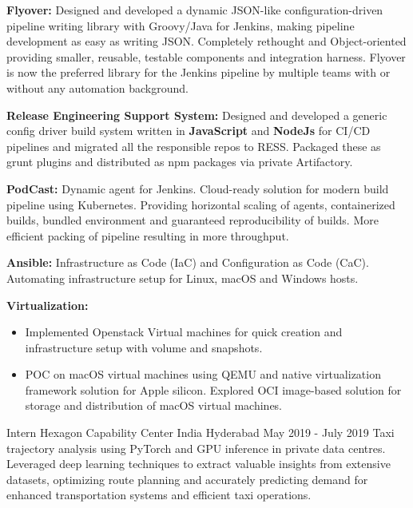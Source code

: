 \begin{cventries}
{        \item \textbf{Flyover:} Designed and developed a dynamic JSON-like configuration-driven pipeline writing library with Groovy/Java for Jenkins, making pipeline development as easy as writing JSON. Completely rethought and Object-oriented providing smaller, reusable, testable components and integration harness. Flyover is now the preferred library for the Jenkins pipeline by multiple teams with or without any automation background.
        \item \textbf{Release Engineering Support System:} Designed and developed a generic config driver build system written in \textbf{JavaScript} and \textbf{NodeJs} for CI/CD pipelines and migrated all the responsible repos to RESS. Packaged these as grunt plugins and distributed as npm packages via private Artifactory.
        \item \textbf{PodCast:} Dynamic agent for Jenkins. Cloud-ready solution for modern build pipeline using Kubernetes. Providing horizontal scaling of agents, containerized builds, bundled environment and guaranteed reproducibility of builds. More efficient packing of pipeline resulting in more throughput.
        \item \textbf{Ansible:} Infrastructure as Code (IaC) and Configuration as Code (CaC). Automating infrastructure setup for Linux, macOS and Windows hosts.
        \item \textbf{Virtualization:}
        \begin{itemize}
            \item Implemented Openstack Virtual machines for quick creation and infrastructure setup with volume and snapshots.
            \item POC on macOS virtual machines using QEMU and native virtualization framework solution for Apple silicon. Explored OCI image-based solution for storage and distribution of macOS virtual machines.
        \end{itemize}
    }

\vspace{-5mm}

\cventry
    {Intern} %
    {Hexagon Capability Center India} %
    {Hyderabad} %
    {May 2019 - July 2019} %
    {
        Taxi trajectory analysis using PyTorch and GPU inference in private data centres. Leveraged deep learning techniques to extract valuable insights from extensive datasets, optimizing route planning and accurately predicting demand for enhanced transportation systems and efficient taxi operations.
    }

\end{cventries}

\vspace{-2mm}
